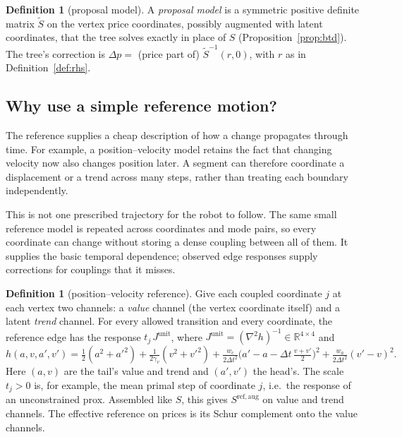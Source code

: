 \documentclass[11pt]{article}
\newcommand{\R}{\mathbb{R}}
\theoremstyle{plain}
\theoremstyle{definition}
\newtheorem{definition}[theorem]{Definition}
\theoremstyle{remark}
\begin{document}
\begin{definition}[proposal model]\label{def:proposal}
A \emph{proposal model} is a symmetric positive definite matrix $\tilde S$ on the vertex price coordinates, possibly augmented with latent coordinates, that the tree solves exactly in place of $S$ (Proposition~\ref{prop:btd}). The tree's correction is $\Delta p=$ (price part of) $\tilde S^{-1}(r,0)$, with $r$ as in Definition~\ref{def:rhs}.
\end{definition}

\subsection{Why use a simple reference motion?}
The reference supplies a cheap description of how a change propagates through time. For example, a position--velocity model retains the fact that changing velocity now also changes position later. A segment can therefore coordinate a displacement or a trend across many steps, rather than treating each boundary independently.

This is not one prescribed trajectory for the robot to follow. The same small reference model is repeated across coordinates and mode pairs, so every coordinate can change without storing a dense coupling between all of them. It supplies the basic temporal dependence; observed edge responses supply corrections for couplings that it misses.

\begin{definition}[position--velocity reference]\label{def:reference}
Give each coupled coordinate $j$ at each vertex two channels: a \emph{value} channel (the vertex coordinate itself) and a latent \emph{trend} channel. For every allowed transition and every coordinate, the reference edge has the response $t_j\,J^{\mathrm{unit}}$, where $J^{\mathrm{unit}}=(\nabla^2h)^{-1}\in\R^{4\times4}$ and
\[
h(a,v,a',v')=\tfrac12(a^2+a'^2)+\tfrac1{2\gamma_v}(v^2+v'^2)+\tfrac{w_c}{2\Delta t^2}\Big(a'-a-\Delta t\,\tfrac{v+v'}2\Big)^2+\tfrac{w_a}{2\Delta t^2}(v'-v)^2 .
\]
Here $(a,v)$ are the tail's value and trend and $(a',v')$ the head's. The scale $t_j>0$ is, for example, the mean primal step of coordinate $j$, i.e.\ the response of an unconstrained prox. Assembled like $S$, this gives $S^{\mathrm{ref,aug}}$ on value and trend channels. The effective reference on prices is its Schur complement onto the value channels.
\end{definition}
\end{document}
